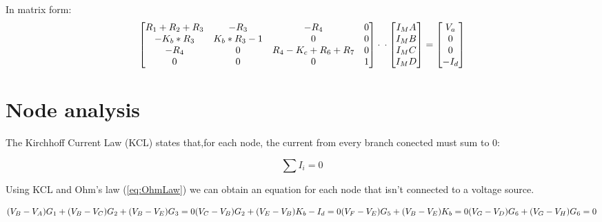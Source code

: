 In matrix form:
  \begin{equation}\label{eq:matrixeqn}
\begin{bmatrix}
R_1+R_2+R_3 & -R_3 & -R_4 & 0 \\

-K_b*R_3 & K_b* R_3-1 & 0 & 0 \\

-R_4 & 0 & R_4-K_c+R_6+R_7 & 0 \\

0 & 0 & 0 & 1 \\
\end{bmatrix}
\cdot

\\

\cdot
\begin{bmatrix}
I_MA \\
I_MB \\
I_MC \\
I_MD \\
    \end{bmatrix}
=
    \begin{bmatrix}
V_a \\
0 \\
0 \\
-I_d\\
    \end{bmatrix}
  \end{equation}



\section{Node analysis}
The Kirchhoff Current Law (KCL) states that,for each node, the current from every branch conected must sum to 0:

\begin{equation}
  \sum I_i = 0
  \label{eq:KCL}
\end{equation}


Using KCL and Ohm's law (\ref{eq:OhmLaw}) we can obtain an equation for each node that isn't connected to a voltage source.

\begin{equation}
    
  (V_B-V_A)G_1+(V_B-V_C)G_2+(V_B-V_E)G_3=0\\
  
  (V_C-V_B)G_2+(V_E-V_B)K_b-I_d=0\\
  
  (V_F-V_E)G_5+(V_B-V_E)K_b=0\\
  
  (V_G-V_D)G_6+(V_G-V_H)G_6=0\\

  \label{eq:nodos}
\end{equation}


